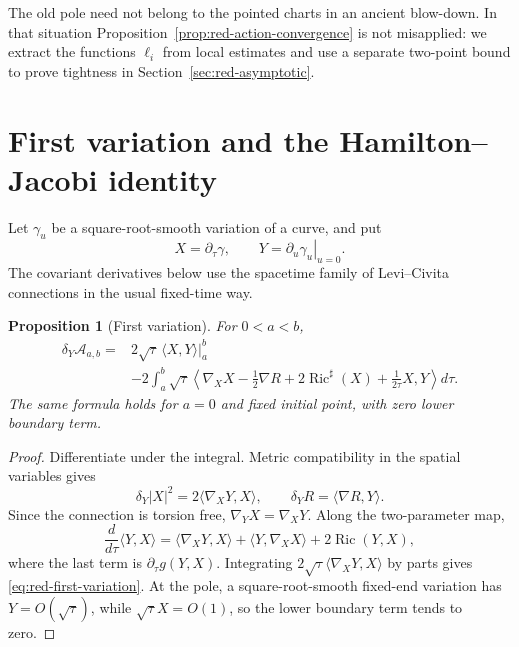 \documentclass[10pt]{coll-l}
\newtheorem{proposition}[theorem]{Proposition}
\theoremstyle{definition}
\theoremstyle{remark}
\numberwithin{section}{chapter}
\numberwithin{equation}{chapter}
\newcommand{\Ric}{\operatorname{Ric}}
\begin{document}
The old pole need not belong to the pointed charts in an ancient blow-down.
In that situation Proposition~\ref{prop:red-action-convergence} is not
misapplied: we extract the functions $\ell_i$ from local estimates and use a
separate two-point bound to prove tightness in
Section~\ref{sec:red-asymptotic}.

\section{First variation and the Hamilton--Jacobi identity}
\label{sec:red-first-variation}

Let $\gamma_u$ be a square-root-smooth variation of a curve, and put
\begin{equation}
        X=\partial_\tau\gamma,
        \qquad Y=\left.\partial_u\gamma_u\right|_{u=0}.
                                                               \label{eq:red-variation-fields}
\end{equation}
The covariant derivatives below use the spacetime family of Levi--Civita
connections in the usual fixed-time way.

\begin{proposition}[First variation]
\label{prop:red-first-variation}
For $0<a<b$,
\begin{align}
 \delta_Y\mathcal A_{a,b}
={}&2\sqrt\tau\,\langle X,Y\rangle\big|_a^b             \label{eq:red-first-variation}\\
 &-2\int_a^b\sqrt\tau\left\langle
   \nabla_X X-\frac12\nabla R+2\Ric^\sharp(X)
       +\frac{1}{2\tau}X,Y\right\rangle d\tau .\nonumber
\end{align}
The same formula holds for $a=0$ and fixed initial point, with zero lower
boundary term.
\end{proposition}

\begin{proof}
Differentiate under the integral.  Metric compatibility in the spatial
variables gives
\begin{equation}
 \delta_Y|X|^2=2\langle\nabla_XY,X\rangle,
 \qquad \delta_YR=\langle\nabla R,Y\rangle.             \label{eq:red-first-variation-raw}
\end{equation}
Since the connection is torsion free, $\nabla_YX=\nabla_XY$.  Along the
two-parameter map,
\begin{equation}
 \frac d{d\tau}\langle Y,X\rangle
 =\langle\nabla_XY,X\rangle+\langle Y,\nabla_XX\rangle
       +2\Ric(Y,X),                                     \label{eq:red-time-pairing}
\end{equation}
where the last term is $\partial_\tau g(Y,X)$.  Integrating
$2\sqrt\tau\langle\nabla_XY,X\rangle$ by parts gives
\eqref{eq:red-first-variation}.  At the pole, a square-root-smooth fixed-end
variation has $Y=O(\sqrt\tau)$, while $\sqrt\tau X=O(1)$, so the lower
boundary term tends to zero.
\end{proof}
\end{document}
